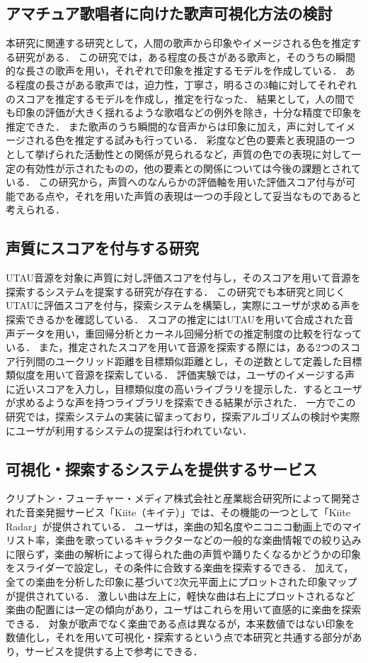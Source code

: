 \documentclass[a4j,8pt,twocolumn]{extarticle}
\begin{document}
\subsection{アマチュア歌唱者に向けた歌声可視化方法の検討}
本研究に関連する研究として，人間の歌声から印象やイメージされる色を推定する研究\cite{ama}がある．
この研究では，ある程度の長さがある歌声と，そのうちの瞬間的な長さの歌声を用い，それぞれで印象を推定するモデルを作成している．
ある程度の長さがある歌声では，迫力性，丁寧さ，明るさの3軸に対してそれぞれのスコアを推定するモデルを作成し，推定を行なった．
結果として，人の間でも印象の評価が大きく揺れるような歌唱などの例外を除き，十分な精度で印象を推定できた．
また歌声のうち瞬間的な音声からは印象に加え，声に対してイメージされる色を推定する試みも行っている．
彩度など色の要素と表現語の一つとして挙げられた活動性との関係が見られるなど，声質の色での表現に対して一定の有効性が示されたものの，他の要素との関係については今後の課題とされている．
この研究から，声質へのなんらかの評価軸を用いた評価スコア付与が可能である点や，それを用いた声質の表現は一つの手段として妥当なものであると考えられる．

\subsection{声質にスコアを付与する研究}
UTAU音源を対象に声質に対し評価スコアを付与し，そのスコアを用いて音源を探索するシステムを提案する研究\cite{ong}が存在する．
この研究でも本研究と同じくUTAUに評価スコアを付与，探索システムを構築し，実際にユーザが求める声を探索できるかを確認している．
スコアの推定にはUTAUを用いて合成された音声データを用い，重回帰分析とカーネル回帰分析での推定制度の比較を行なっている．
また，推定されたスコアを用いて音源を探索する際には，ある2つのスコア行列間のユークリッド距離を目標類似距離とし，その逆数として定義した目標類似度を用いて音源を探索している．
評価実験では，ユーザのイメージする声に近いスコアを入力し，目標類似度の高いライブラリを提示した．するとユーザが求めるような声を持つライブラリを探索できる結果が示された．
一方でこの研究では，探索システムの実装に留まっており，探索アルゴリズムの検討や実際にユーザが利用するシステムの提案は行われていない．

\subsection{可視化・探索するシステムを提供するサービス}
クリプトン・フューチャー・メディア株式会社と産業総合研究所によって開発された音楽発掘サービス「Kiite（キイテ）」では、その機能の一つとして「Kiite Radar」が提供されている\cite{kiite}．
ユーザは，楽曲の知名度やニコニコ動画上でのマイリスト率，楽曲を歌っているキャラクターなどの一般的な楽曲情報での絞り込みに限らず，楽曲の解析によって得られた曲の声質や踊りたくなるかどうかの印象をスライダーで設定し，その条件に合致する楽曲を探索するできる．
加えて，全ての楽曲を分析した印象に基づいて2次元平面上にプロットされた印象マップが提供されている．
激しい曲は左上に，軽快な曲は右上にプロットされるなど楽曲の配置には一定の傾向があり，ユーザはこれらを用いて直感的に楽曲を探索できる．
対象が歌声でなく楽曲である点は異なるが，本来数値ではない印象を数値化し，それを用いて可視化・探索するという点で本研究と共通する部分があり，サービスを提供する上で参考にできる．
\end{document}
